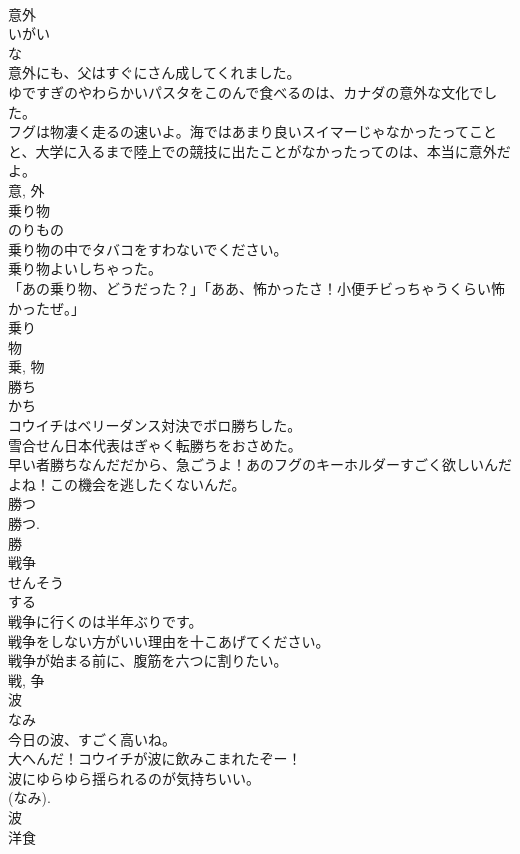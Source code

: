 \documentclass[8pt]{extreport}
\begin{document}
\begin{CJK}{UTF8}{min}
\\	意外	
\\	いがい	
\\	な 
\\	意外にも、父はすぐにさん成してくれました。	
\\	ゆですぎのやわらかいパスタをこのんで食べるのは、カナダの意外な文化でした。	
\\	フグは物凄く走るの速いよ。海ではあまり良いスイマーじゃなかったってことと、大学に入るまで陸上での競技に出たことがなかったってのは、本当に意外だよ。	
\\	意, 外	
\\	乗り物	
\\	のりもの	
\\	乗り物の中でタバコをすわないでください。	
\\	乗り物よいしちゃった。	
\\	「あの乗り物、どうだった？」「ああ、怖かったさ！小便チビっちゃうくらい怖かったぜ。」	
\\	乗り 
\\	物 
\\	乗, 物	
\\	勝ち	
\\	かち	
\\	コウイチはベリーダンス対決でボロ勝ちした。	
\\	雪合せん日本代表はぎゃく転勝ちをおさめた。	
\\	早い者勝ちなんだだから、急ごうよ！あのフグのキーホルダーすごく欲しいんだよね！この機会を逃したくないんだ。	
\\	勝つ 
\\	勝つ. 
\\	勝	
\\	戦争	
\\	せんそう	
\\	する 
\\	戦争に行くのは半年ぶりです。	
\\	戦争をしない方がいい理由を十こあげてください。	
\\	戦争が始まる前に、腹筋を六つに割りたい。	
\\	戦, 争	
\\	波	
\\	なみ	
\\	今日の波、すごく高いね。	
\\	大へんだ！コウイチが波に飲みこまれたぞー！	
\\	波にゆらゆら揺られるのが気持ちいい。	
\\	(なみ). 
\\	波	
\\	洋食	

\end{CJK}
\end{document}
